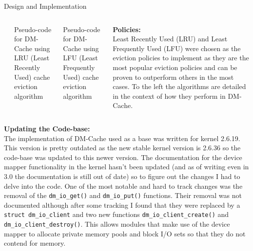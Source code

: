 \documentclass[final,12pt]{beamer}
\begin{document}
\begin{frame}{}
\begin{columns}
  \end{columns}

  \begin{block}{\large Design and Implementation}

    \begin{columns}

      \begin{column}{.01\textwidth}
      \end{column}

      \begin{column}{.33\textwidth}
        

        \centering \small Pseudo-code for DM-Cache using LRU (Least Recently
        Used) cache eviction algorithm
      \end{column}

      \begin{column}{.33\textwidth}
        

        \centering \small Pseudo-code for DM-Cache using LFU (Least Frequently
        Used) cache eviction algorithm
      \end{column}

      \begin{column}{.33\textwidth}

        \textbf{Policies:} \\

        Least Recently Used (LRU) and Least Frequently Used (LFU) were chosen as
        the eviction policies to implement as they are the most popular eviction
        policies and can be proven to outperform others in the most cases. To
        the left the algorithms are detailed in the context of how they perform
        in DM-Cache.

      \end{column}

    \end{columns}

    \textbf{Updating the Code-base:} \\

    The implementation of DM-Cache used as a base was written for kernel
    2.6.19. This version is pretty outdated as the new stable kernel version is
    2.6.36 so the code-base was updated to this newer version. The documentation
    for the device mapper functionality in the kernel hasn't been updated (and
    as of writing even in 3.0 the documentation is still out of date) so to
    figure out the changes I had to delve into the code. One of the most notable
    and hard to track changes was the removal of the \texttt{dm\_io\_get()} and
    \texttt{dm\_io\_put()} functions. Their removal was not documented although
    after some tracking I found that they were replaced by a \texttt{struct
      dm\_io\_client} and two new functions \texttt{dm\_io\_client\_create()}
    and \texttt{dm\_io\_client\_destroy()}. This allows modules that make use of
    the device mapper to allocate private memory pools and block I/O sets so
    that they do not contend for memory.


\end{block}
\end{frame}
\end{document}
